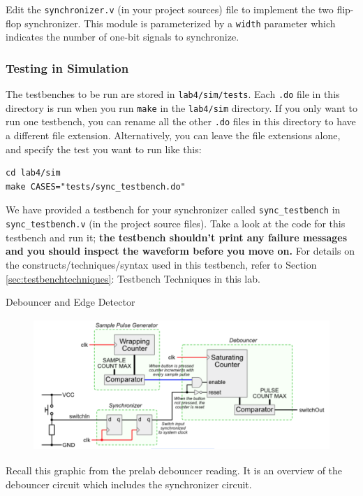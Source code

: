 \documentclass[11pt]{article}
\makeatletter
\renewcommand{\subsection}
{\@startsection {subsection}{1}{0pt}
 {-1ex}
 {0.5ex}
 {\bfseries\normalsize}}
\makeatother
\begin{document}
Edit the \verb|synchronizer.v| (in your project sources) file to implement the two flip-flop synchronizer. This module is parameterized by a \verb|width| parameter which indicates the number of one-bit signals to synchronize.

\subsubsection{Testing in Simulation}
The testbenches to be run are stored in \verb|lab4/sim/tests|. Each \verb|.do| file in this directory is run when you run \verb|make| in the \verb|lab4/sim| directory. If you only want to run one testbench, you can rename all the other \verb|.do| files in this directory to have a different file extension. Alternatively, you can leave the file extensions alone, and specify the test you want to run like this:

\begin{verbatim}
cd lab4/sim
make CASES="tests/sync_testbench.do"
\end{verbatim}

We have provided a testbench for your synchronizer called \verb|sync_testbench| in \verb|sync_testbench.v| (in the project source files). Take a look at the code for this testbench and run it; \textbf{the testbench shouldn't print any failure messages and you should inspect the waveform before you move on.} For details on the constructs/techniques/syntax used in this testbench, refer to Section \ref{sec:testbenchtechniques}: Testbench Techniques in this lab.

\subsection{Debouncer and Edge Detector}

\begin{figure}[H]
	\centerline{\includegraphics[height=5cm]{figs/lab2_fig2.png}}
\end{figure}

Recall this graphic from the prelab debouncer reading. It is an overview of the debouncer circuit which includes the synchronizer circuit.
\end{document}
